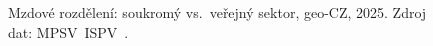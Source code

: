 \def\strProblemyVerejnySoukromyDistCaption{Mzdové rozdělení: soukromý vs.\ veřejný sektor, \acs{geo-CZ}, 2025. Zdroj dat: \acs{MPSV}~\acs{ISPV}~\cite{mpsv_ispv}.}%
%
\begin{figure}[htbp]
  \centering
  \resizebox{0.85\linewidth}{!}{}
  \caption{\strProblemyVerejnySoukromyDistCaption}
  \label{fig:problemy_verejny_soukromy_dist}
\end{figure}
